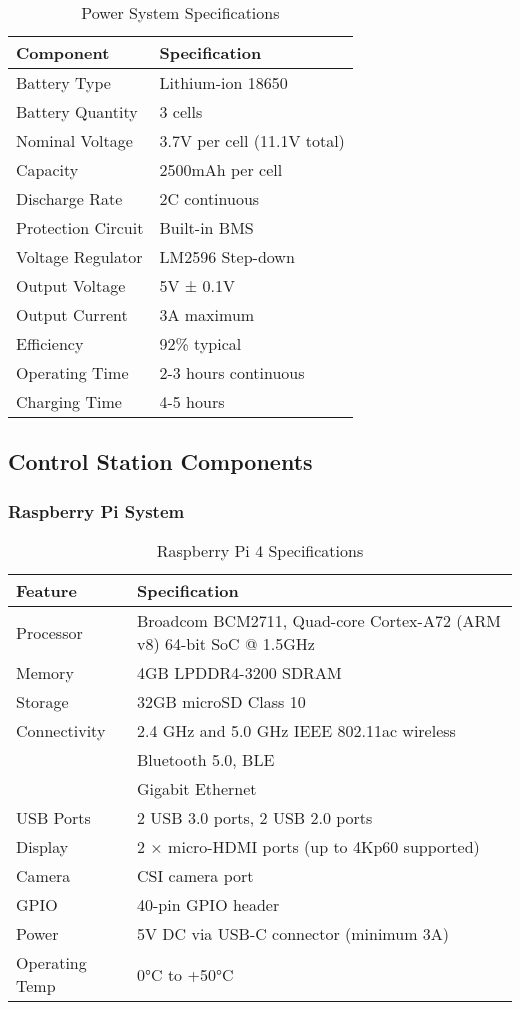 \begin{table}[H]
\centering
\caption{Power System Specifications}
\begin{tabular}{|l|l|}
\hline
\textbf{Component} & \textbf{Specification} \\
\hline
Battery Type & Lithium-ion 18650 \\
Battery Quantity & 3 cells \\
Nominal Voltage & 3.7V per cell (11.1V total) \\
Capacity & 2500mAh per cell \\
Discharge Rate & 2C continuous \\
Protection Circuit & Built-in BMS \\
Voltage Regulator & LM2596 Step-down \\
Output Voltage & 5V ± 0.1V \\
Output Current & 3A maximum \\
Efficiency & 92\% typical \\
Operating Time & 2-3 hours continuous \\
Charging Time & 4-5 hours \\
\hline
\end{tabular}
\label{tab:power}
\end{table}

\subsection{Control Station Components}

\subsubsection{Raspberry Pi System}

\begin{table}[H]
\centering
\caption{Raspberry Pi 4 Specifications}
\begin{tabular}{|l|l|}
\hline
\textbf{Feature} & \textbf{Specification} \\
\hline
Processor & Broadcom BCM2711, Quad-core Cortex-A72 (ARM v8) 64-bit SoC @ 1.5GHz \\
Memory & 4GB LPDDR4-3200 SDRAM \\
Storage & 32GB microSD Class 10 \\
Connectivity & 2.4 GHz and 5.0 GHz IEEE 802.11ac wireless \\
& Bluetooth 5.0, BLE \\
& Gigabit Ethernet \\
USB Ports & 2 USB 3.0 ports, 2 USB 2.0 ports \\
Display & 2 × micro-HDMI ports (up to 4Kp60 supported) \\
Camera & CSI camera port \\
GPIO & 40-pin GPIO header \\
Power & 5V DC via USB-C connector (minimum 3A) \\
Operating Temp & 0°C to +50°C \\
\hline
\end{tabular}
\label{tab:rpi}
\end{table}

